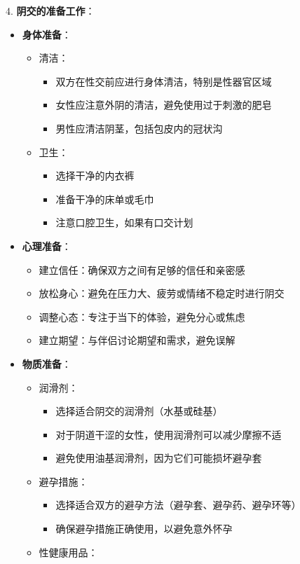 \documentclass[12pt,UTF8]{ctexbook}
\begin{document}
4. \textbf{阴交的准备工作}：
\begin{itemize}
	\item \textbf{身体准备}：
	\begin{itemize}
		\item 清洁：
		\begin{itemize}
			\item 双方在性交前应进行身体清洁，特别是性器官区域
			\item 女性应注意外阴的清洁，避免使用过于刺激的肥皂
			\item 男性应清洁阴茎，包括包皮内的冠状沟
		\end{itemize}
		\item 卫生：
		\begin{itemize}
			\item 选择干净的内衣裤
			\item 准备干净的床单或毛巾
			\item 注意口腔卫生，如果有口交计划
		\end{itemize}
	\end{itemize}
	\item \textbf{心理准备}：
	\begin{itemize}
		\item 建立信任：确保双方之间有足够的信任和亲密感
		\item 放松身心：避免在压力大、疲劳或情绪不稳定时进行阴交
		\item 调整心态：专注于当下的体验，避免分心或焦虑
		\item 建立期望：与伴侣讨论期望和需求，避免误解
	\end{itemize}
	\item \textbf{物质准备}：
	\begin{itemize}
		\item 润滑剂：
		\begin{itemize}
			\item 选择适合阴交的润滑剂（水基或硅基）
			\item 对于阴道干涩的女性，使用润滑剂可以减少摩擦不适
			\item 避免使用油基润滑剂，因为它们可能损坏避孕套
		\end{itemize}
		\item 避孕措施：
		\begin{itemize}
			\item 选择适合双方的避孕方法（避孕套、避孕药、避孕环等）
			\item 确保避孕措施正确使用，以避免意外怀孕
		\end{itemize}
		\item 性健康用品：

\end{itemize}
\end{itemize}
\end{document}
